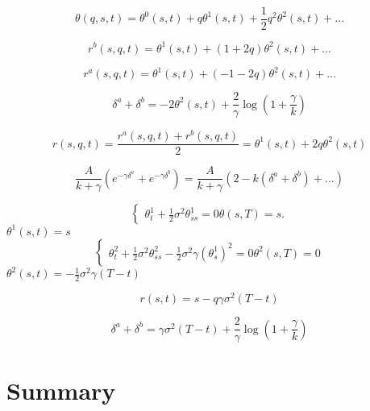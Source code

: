 \begin{equation}
    \theta(q,s,t)=\theta^0(s,t)+q\theta^1(s,t)+\frac{1}{2}q^2\theta^2(s,t)+...
\end{equation}

\begin{equation}
    r^b(s,q,t)=\theta^1(s,t)+(1+2q)\theta^2(s,t)+...
\end{equation}

\begin{equation}
    r^a(s,q,t)=\theta^1(s,t)+(-1-2q)\theta^2(s,t)+...
\end{equation}

\begin{equation}
    \delta^a+\delta^b=-2\theta^2(s,t)+\frac{2}{\gamma}\log\left(1+\frac{\gamma}{k}\right)
\end{equation}

\begin{equation}
    r(s,q,t)=\frac{r^a(s,q,t)+r^b(s,q,t)}{2}=\theta^1(s,t)+2q\theta^2(s,t)
\end{equation}

\begin{equation}
    \frac{A}{k+\gamma}(e^{-\gamma\delta^a}+e^{-\gamma\delta^b})=\frac{A}{k+\gamma}(2-k(\delta^a+\delta^b)+...)
\end{equation}

\begin{equation}
    \begin{cases} 
        \theta^1_t+\frac{1}{2}\sigma^2\theta^1_{ss}=0
        \theta(s,T)=s.
    \end{cases}
\end{equation}
$\theta^1(s,t)=s$
\begin{equation}
    \begin{cases}
        \theta^2_t+\frac{1}{2}\sigma^2\theta^2_{ss}-\frac{1}{2}\sigma^2\gamma(\theta^1_s)^2=0
        \theta^2(s,T)=0
    \end{cases}
\end{equation}
$\theta^2(s,t)=-\frac{1}{2}\sigma^2\gamma(T-t)$

\begin{equation}
    r(s,t)=s-q\gamma\sigma^2(T-t)
\end{equation}

\begin{equation}
    \delta^a+\delta^b=\gamma\sigma^2(T-t)+\frac{2}{\gamma}\log\left(1+\frac{\gamma}{k}\right)
\end{equation}

\section{Summary}